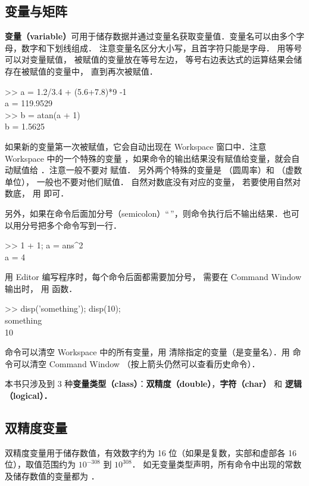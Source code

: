 

\subsection{变量与矩阵}
\textbf{变量（variable）}可用于储存数据并通过变量名获取变量值．变量名可以由多个字母，数字和下划线组成． 注意变量名区分大小写，且首字符只能是字母． 用等号可以对变量赋值， 被赋值的变量放在等号左边， 等号右边表达式的运算结果会储存在被赋值的变量中， 直到再次被赋值．
\begin{Command}
>> a = 1.2/3.4 + (5.6+7.8)*9 -1 \\
a = 119.9529 \\
>> b = atan(a + 1) \\
b = 1.5625
\end{Command}
如果新的变量第一次被赋值，它会自动出现在 Workspace 窗口中．注意 Workspace 中的一个特殊的变量 ，如果命令的输出结果没有赋值给变量，就会自动赋值给 ．注意一般不要对  赋值． 另外两个特殊的变量是  （圆周率）和  （虚数单位）， 一般也不要对他们赋值． 自然对数底没有对应的变量， 若要使用自然对数底， 用  即可．

另外，如果在命令后面加分号（semicolon）“\,\x{;}”，则命令执行后不输出结果．也可以用分号把多个命令写到一行．
\begin{Command}
>> 1 + 1; a = ans\^{}2 \\
a = 4
\end{Command}
用 Editor 编写程序时，每个命令后面都需要加分号， 需要在 Command Window 输出时， 用  函数．
\begin{Command}
>> disp({\color{string}'something'}); disp(10);\\
something\\
10
\end{Command}

 命令可以清空 Workspace 中的所有变量，用  清除指定的变量（是变量名）．用  命令可以清空 Command Window （按上箭头仍然可以查看历史命令）．

本书只涉及到 3 种\textbf{变量类型（class）}：\textbf{双精度（double）}，\textbf{字符（char）} 和 \textbf{逻辑（logical）．}

\subsection{双精度变量}

双精度变量用于储存数值，有效数字约为 16 位（如果是复数，实部和虚部各 16 位），取值范围约为 $10^{-308}$ 到 $10^{308}$． 如无变量类型声明，所有命令中出现的常数及储存数值的变量都为 ．

